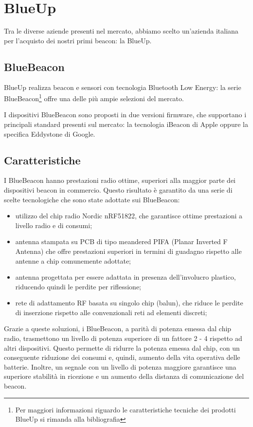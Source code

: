 \section{BlueUp}
Tra le diverse aziende presenti nel mercato, abbiamo scelto un'azienda italiana per l'acquisto dei nostri primi beacon: la BlueUp.
\subsection{BlueBeacon}
BlueUp realizza beacon e sensori con tecnologia Bluetooth Low Energy: la serie BlueBeacon\footnote{Per maggiori informazioni riguardo le caratteristiche tecniche dei prodotti BlueUp si rimanda alla bibliografia\cite{blueup}} offre una delle più ampie selezioni del mercato. 

I dispositivi BlueBeacon sono proposti in due versioni firmware, che supportano i principali standard presenti sul mercato: 
la tecnologia iBeacon di Apple oppure la specifica Eddystone di Google.
\subsection{Caratteristiche}
I BlueBeacon hanno prestazioni radio ottime, superiori alla maggior parte dei dispositivi beacon in commercio. 
Questo risultato è garantito da una serie di scelte tecnologiche che sono state adottate sui BlueBeacon:
\begin{itemize}
\item utilizzo del chip radio Nordic nRF51822, che garantisce ottime prestazioni a livello radio e di consumi;
\item antenna stampata su PCB di tipo meandered PIFA (Planar Inverted F Antenna) che offre prestazioni superiori in termini di guadagno rispetto alle antenne a chip comunemente adottate;
\item antenna progettata per essere adattata in presenza dell'involucro plastico, riducendo quindi le perdite per riflessione;
\item rete di adattamento RF basata su singolo chip (balun), che riduce le perdite di inserzione rispetto alle convenzionali reti ad elementi discreti;
\end{itemize}

Grazie a queste soluzioni, i BlueBeacon, a parità di potenza emessa dal chip radio, trasmettono un livello di potenza superiore di un fattore 2 - 4 rispetto ad altri dispositivi. 
Questo permette di ridurre la potenza emessa dal chip, con un conseguente riduzione dei consumi e, quindi, aumento della vita operativa delle batterie. 
Inoltre, un segnale con un livello di potenza maggiore garantisce una superiore stabilità in ricezione e un aumento della distanza di comunicazione del beacon. 
